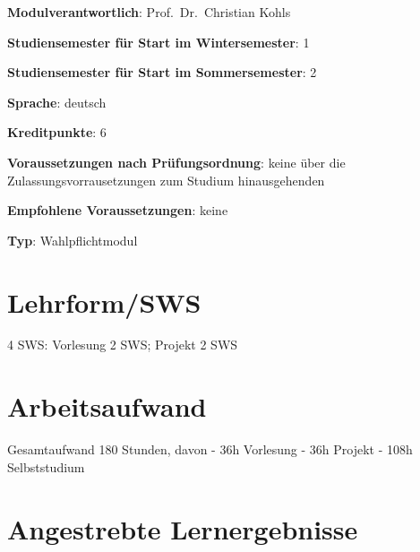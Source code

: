 \begin{modulHead}
\textbf{Modulverantwortlich}: Prof.~Dr.~Christian
Kohls
\end{modulHead}
\begin{modulHead}
\textbf{Studiensemester für
Start im Wintersemester}:
1
\end{modulHead}
\begin{modulHead}
\textbf{Studiensemester für Start
im Sommersemester}:
2
\end{modulHead}
\begin{modulHead}
\textbf{Sprache}:
deutsch
\end{modulHead}
\begin{modulHead}
\textbf{Kreditpunkte}:
6
\end{modulHead}
\begin{modulHead}
\textbf{Voraussetzungen nach
Prüfungsordnung}: keine über die Zulassungsvorrausetzungen zum Studium
hinausgehenden
\end{modulHead}
\begin{modulHead}
\textbf{Empfohlene
Voraussetzungen}: keine
\end{modulHead}
\begin{modulHead}
\textbf{Typ}:
Wahlpflichtmodul
\end{modulHead}


\section*{Lehrform/SWS
\label{/mi-2017/modulbeschreibungen-master/MA_SC_WPF_eScience}}\label{lehrformsws-pathlabelmi-2017modulbeschreibungen-mastermaux5fscux5fwpfux5fescience}

4 SWS: Vorlesung 2 SWS; Projekt 2 SWS

\section*{Arbeitsaufwand\label{/mi-2017/modulbeschreibungen-master/MA_SC_WPF_eScience}}\label{arbeitsaufwandpathlabelmi-2017modulbeschreibungen-mastermaux5fscux5fwpfux5fescience}

Gesamtaufwand 180 Stunden, davon - 36h Vorlesung - 36h Projekt - 108h
Selbststudium

\section*{Angestrebte
Lernergebnisse\label{/mi-2017/modulbeschreibungen-master/MA_SC_WPF_eScience}}\label{angestrebte-lernergebnissepathlabelmi-2017modulbeschreibungen-mastermaux5fscux5fwpfux5fescience}

